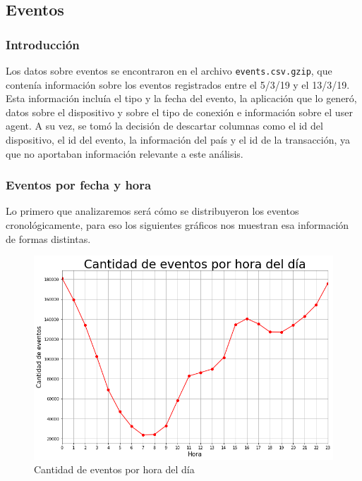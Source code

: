 \documentclass[a4paper, 12pt]{article}
\begin{document}
		

\clearpage
\subsection{Eventos}
	\subsubsection{Introducción}
		Los datos sobre eventos se encontraron en el archivo \texttt{events.csv.gzip}, que contenía información sobre los eventos registrados entre el 5/3/19 y el 13/3/19. Esta información incluía el tipo y la fecha del evento, la aplicación que lo generó, datos sobre el dispositivo y sobre el tipo de conexión e información sobre el user agent. A su vez, se tomó la decisión de descartar columnas como el id del dispositivo, el id del evento, la información del país y el id de la transacción, ya que no aportaban información relevante a este análisis.
		
	\subsubsection{Eventos por fecha y hora}
		
		Lo primero que analizaremos será cómo se distribuyeron los eventos cronológicamente, para eso los siguientes gráficos nos muestran esa información de formas distintas.
		
		\FloatBarrier
		\begin{figure}[h]
			\centering
			\includegraphics[width=\textwidth]{images/events/eventsxhora.png}
			\caption{Cantidad de eventos por hora del día}
		\end{figure}
		\FloatBarrier
		
\end{document}
